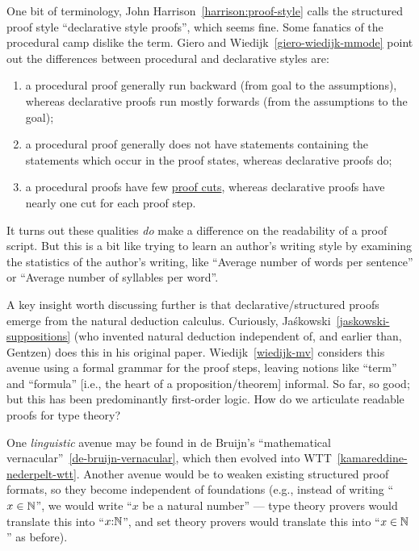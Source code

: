 One bit of terminology, John Harrison~\ref{harrison:proof-style} calls
the structured proof style ``declarative style proofs'', which seems
fine. Some fanatics of the procedural camp dislike the term. Giero and
Wiedijk~\ref{giero-wiedijk-mmode} point out the
differences between procedural and declarative styles are:
\begin{enumerate}
\item a procedural proof generally run backward (from goal to the
  assumptions), whereas declarative proofs run mostly forwards (from the
  assumptions to the goal);
\item a procedural proof generally does not have statements containing
  the statements which occur in the proof states, whereas declarative
  proofs do;
\item a procedural proofs have few \ifblog\href{https://en.wikipedia.org/wiki/Cut_rule}{proof cuts}\fi{}\fi, whereas declarative
  proofs have nearly one cut for each proof step.
\end{enumerate}
It turns out these qualities \emph{do} make a difference on the
readability of a proof script. But this is a bit like trying to learn an
author's writing style by examining the statistics of the author's
writing, like ``Average number of words per sentence'' or ``Average
number of syllables per word''.

A key insight worth discussing further is that declarative/structured
proofs emerge from the natural deduction calculus. Curiously,
Ja\'skowski~\ref{jaskowski-suppositions} (who invented natural deduction
independent of, and earlier than, Gentzen) does this in his original
paper. Wiedijk~\ref{wiedijk-mv} considers this avenue using a formal
grammar for the proof steps, leaving notions like ``term'' and
``formula'' [i.e., the heart of a proposition/theorem] informal.
So far, so good; but this has been predominantly first-order logic. How
do we articulate readable proofs for type theory?

One \emph{linguistic} avenue may be found in de Bruijn's ``mathematical
vernacular''~\ref{de-bruijn-vernacular}, which then evolved into
WTT~\ref{kamareddine-nederpelt-wtt}. Another avenue would be to weaken
existing structured proof formats, so they become independent of
foundations (e.g., instead of writing ``$x\in\mathbb{N}$'', we would write
``$x$ be a natural number'' --- type theory provers would translate this
into ``$x{:}\mathbb{N}$'', and set theory provers would translate this into
``$x\in\mathbb{N}$'' as before).

